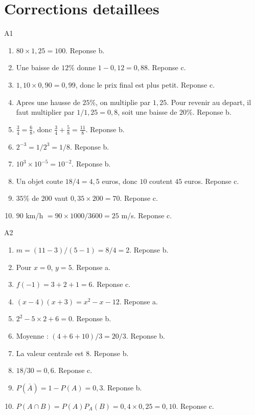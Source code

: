 \documentclass[11pt,a4paper]{article}
\begin{document}
\newpage
\section{Corrections detaillees}

\begin{corrige}{A1}
\begin{enumerate}
    \item $80\times 1,25=100$. Reponse b.
    \item Une baisse de $12\%$ donne $1-0,12=0,88$. Reponse c.
    \item $1,10\times0,90=0,99$, donc le prix final est plus petit. Reponse c.
    \item Apres une hausse de $25\%$, on multiplie par $1,25$. Pour revenir au depart, il faut multiplier par $1/1,25=0,8$, soit une baisse de $20\%$. Reponse b.
    \item $\frac34=\frac68$, donc $\frac34+\frac58=\frac{11}{8}$. Reponse b.
    \item $2^{-3}=1/2^3=1/8$. Reponse b.
    \item $10^3\times10^{-5}=10^{-2}$. Reponse b.
    \item Un objet coute $18/4=4,5$ euros, donc $10$ coutent $45$ euros. Reponse c.
    \item $35\%$ de 200 vaut $0,35\times200=70$. Reponse c.
    \item $90$ km/h $=90\times1000/3600=25$ m/s. Reponse c.
\end{enumerate}
\end{corrige}

\begin{corrige}{A2}
\begin{enumerate}
    \item $m=(11-3)/(5-1)=8/4=2$. Reponse b.
    \item Pour $x=0$, $y=5$. Reponse a.
    \item $f(-1)=3+2+1=6$. Reponse c.
    \item $(x-4)(x+3)=x^2-x-12$. Reponse a.
    \item $2^2-5\times2+6=0$. Reponse b.
    \item Moyenne : $(4+6+10)/3=20/3$. Reponse b.
    \item La valeur centrale est $8$. Reponse b.
    \item $18/30=0,6$. Reponse c.
    \item $P(\overline A)=1-P(A)=0,3$. Reponse b.
    \item $P(A\cap B)=P(A)P_A(B)=0,4\times0,25=0,10$. Reponse c.
\end{enumerate}
\end{corrige}
\end{document}
